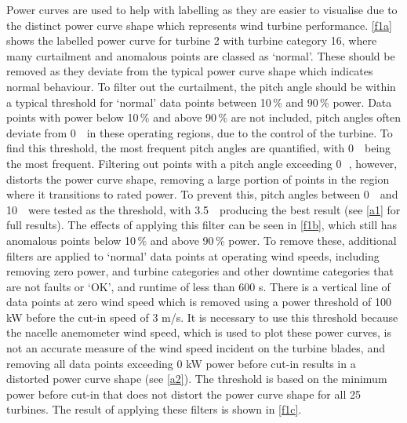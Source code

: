 Power curves are used to help with labelling as they are easier to visualise due to the distinct power curve shape which represents wind turbine performance. \autoref{f1a} shows the labelled power curve for turbine 2 with turbine category 16, where many curtailment and anomalous points are classed as `normal'. These should be removed as they deviate from the typical power curve shape which indicates normal behaviour. To filter out the curtailment, the pitch angle should be within a typical threshold for `normal' data points between 10\,\% and 90\,\% power. Data points with power below 10\,\% and above 90\,\% are not included, pitch angles often deviate from 0\,\textdegree~ in these operating regions, due to the control of the turbine. To find this threshold, the most frequent pitch angles are quantified, with 0\,\textdegree~ being the most frequent. Filtering out points with a pitch angle exceeding 0\,\textdegree~, however, distorts the power curve shape, removing a large portion of points in the region where it transitions to rated power. To prevent this, pitch angles between 0\,\textdegree~ and 10\,\textdegree~ were tested as the threshold, with 3.5\,\textdegree~ producing the best result (see \autoref{a1} for full results). The effects of applying this filter can be seen in \autoref{f1b}, which still has anomalous points below 10\,\% and above 90\,\% power. To remove these, additional filters are applied to `normal' data points at operating wind speeds, including removing zero power, and turbine categories and other downtime categories that are not faults or `OK', and runtime of less than 600 s. There is a vertical line of data points at zero wind speed which is removed using a power threshold of 100 kW before the cut-in speed of 3 m/s. It is necessary to use this threshold because the nacelle anemometer wind speed, which is used to plot these power curves, is not an accurate measure of the wind speed incident on the turbine blades, and removing all data points exceeding 0 kW power before cut-in results in a distorted power curve shape (see \autoref{a2}). The threshold is based on the minimum power before cut-in that does not distort the power curve shape for all 25 turbines. The result of applying these filters is shown in \autoref{f1c}.

